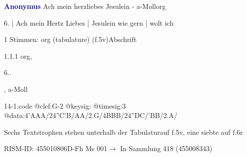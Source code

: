 \documentclass[twocolumn]{book}
\begin{document}
\par \vspace{7pt} \textcolor{darkblue}{\textbf{Anonymus  }}\hfillplus{\textbf{[14]}}\newline Ach mein herzliebes Jesulein - a-Moll\newline org
\par \begin{itshape}[f.5v, at left:] 6. | Ach mein Hertz Liebes | Jesulein wie gern | wolt ich\end{itshape} 
\par \textcolor{darkblue}{}  1 Stimmen: org (tabulature)  (f.5v)\newline Abschrift
\par 1.1.1  org, \begin{itshape}6..\end{itshape}, a-Moll\newline \begin{footnotesize}  \end{footnotesize}  
\begin{filecontents*}{14-1.code}
@clef:G-2
@keysig:
@timesig:3
@data:4'AAA/24''C'B/AA/2.G/4BBB/24''DC/'BB/2.A/
\end{filecontents*}
\newline
%
\par Sechs Textstrophen stehen unterhalb der Tabulaturauf f.5v, eine siebte auf f.6r
\par RISM-ID: 455010806\newline D-Fh  Ms 001\newline $\rightarrow$ In Sammlung 418 (455008343)
      
\end{document}
